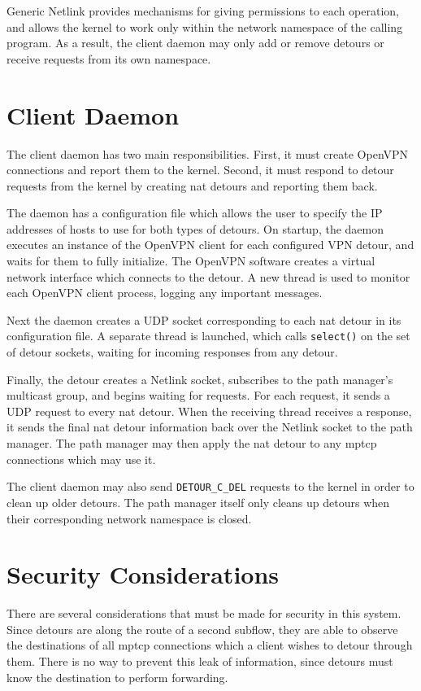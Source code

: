 \documentclass{cwru}
\begin{document}
Generic Netlink provides mechanisms for giving permissions to each operation,
and allows the kernel to work only within the network namespace of the calling
program. As a result, the client daemon may only add or remove detours or
receive requests from its own namespace.

\section{Client Daemon}

The client daemon has two main responsibilities. First, it must create OpenVPN
connections and report them to the kernel. Second, it must respond to detour
requests from the kernel by creating \ac{nat} detours and reporting them back.

The daemon has a configuration file which allows the user to specify the IP
addresses of hosts to use for both types of detours. On startup, the daemon
executes an instance of the OpenVPN client for each configured VPN detour, and
waits for them to fully initialize. The OpenVPN software creates a virtual
network interface which connects to the detour. A new thread is used to monitor
each OpenVPN client process, logging any important messages.

Next the daemon creates a UDP socket corresponding to each \ac{nat} detour in
its configuration file. A separate thread is launched, which calls
\texttt{select()} on the set of detour sockets, waiting for incoming responses
from any detour.

Finally, the detour creates a Netlink socket, subscribes to the path manager's
multicast group, and begins waiting for requests. For each request, it sends a
UDP request to every \ac{nat} detour. When the receiving thread receives a
response, it sends the final \ac{nat} detour information back over the Netlink
socket to the path manager. The path manager may then apply the \ac{nat} detour
to any \ac{mptcp} connections which may use it.

The client daemon may also send \texttt{DETOUR\_C\_DEL} requests to the kernel
in order to clean up older detours. The path manager itself only cleans up
detours when their corresponding network namespace is closed.

\section{Security Considerations}
\label{sec:security}

There are several considerations that must be made for security in this system.
Since detours are along the route of a second subflow, they are able to observe
the destinations of all \ac{mptcp} connections which a client wishes to detour
through them. There is no way to prevent this leak of information, since detours
must know the destination to perform forwarding.
\end{document}
